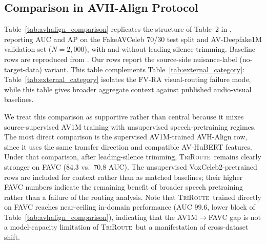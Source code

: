 \documentclass{article}
\newcommand{\method}{\textsc{TriRoute}}
\begin{document}
\subsection{Comparison in AVH-Align Protocol}

Table~\ref{tab:avhalign_comparison} replicates the structure of Table~2 in \citet{smeu2025avhalign}, reporting AUC and AP on the FakeAVCeleb 70/30 test split and AV-Deepfake1M validation set ($N=2{,}000$), with and without leading-silence trimming. Baseline rows are reproduced from \citet{smeu2025avhalign}. Our rows report the source-side nuisance-label (no-target-data) variant. This table complements Table~\ref{tab:external_category}: Table~\ref{tab:external_category} isolates the FV-RA visual-routing failure mode, while this table gives broader aggregate context against published audio-visual baselines.

We treat this comparison as supportive rather than central because it mixes source-supervised AV1M training with unsupervised speech-pretraining regimes. The most direct comparison is the supervised AV1M-trained AVH-Align row, since it uses the same transfer direction and compatible AV-HuBERT features. Under that comparison, after leading-silence trimming, \method\ remains clearly stronger on FAVC ($84.3$ vs.\ $70.8$ AUC). The unsupervised VoxCeleb2-pretrained rows are included for context rather than as matched baselines; their higher FAVC numbers indicate the remaining benefit of broader speech pretraining rather than a failure of the routing analysis.
Note that \method\ trained directly on FAVC reaches near-ceiling in-domain performance (AUC $99.6$, lower block of Table~\ref{tab:avhalign_comparison}), indicating that the AV1M$\rightarrow$FAVC gap is not a model-capacity limitation of \method\ but a manifestation of cross-dataset shift.
\end{document}
